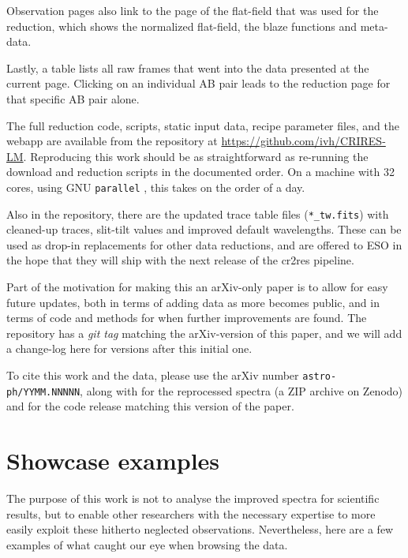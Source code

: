 \documentclass{aa}
\begin{document}
Observation pages also link to the page of the flat-field that was used for the
reduction, which shows the normalized flat-field, the blaze functions and meta-data.

Lastly, a table lists all raw frames that went into the data presented at the current page.
Clicking on an individual AB pair leads to the reduction page for that specific AB pair alone.

The full reduction code, scripts, static input data, recipe parameter files, and the webapp are
 available from the repository at 
\url{https://github.com/ivh/CRIRES-LM}. Reproducing this work should be as
straightforward as re-running the download and reduction scripts in the documented
order. On a machine with 32 cores, using GNU \texttt{parallel} \citep{tange_parallel}, this takes
on the order of a day.

Also in the repository, there are the updated trace table files
(\texttt{*\_tw.fits}) with cleaned-up traces, slit-tilt values and improved default
wavelengths. These can be used as drop-in
replacements for other data reductions, and are offered to ESO in the
hope that they will ship with the next release of the cr2res pipeline. 

Part of the motivation for making this an arXiv-only paper is to allow for
easy future updates, both in terms of adding data as more becomes
public, and in terms of code and methods for when further improvements
are found. The repository has a \emph{git tag} matching the arXiv-version of
this paper, and we will add a change-log here for versions after this initial one.

To cite this work and the data, please use the arXiv number
 \texttt{astro-ph/YYMM.NNNNN}, along with \citet{crires_lm_data} for the
 reprocessed spectra (a ZIP archive on Zenodo) and \citet{crires_lm_code}
 for the code release matching this version of the paper.

\section{Showcase examples}
\label{sec:examples}

The purpose of this work is not to analyse the improved spectra for scientific results,
but to enable other researchers with the necessary expertise to more easily exploit
these hitherto neglected observations. Nevertheless, here are a few examples of
what caught our eye when browsing the data.
\end{document}
